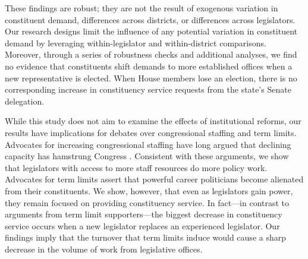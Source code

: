 \documentclass[12pt]{article}
\begin{document}


These findings are robust; they are not the result of exogenous variation in constituent demand, differences across districts, or differences across legislators. Our research designs limit the influence of any potential variation in constituent demand by leveraging within-legislator and within-district comparisons. Moreover, through a series of robustness checks and additional analyses, we find no evidence that constituents shift demands to more established offices when a new representative is elected. When House members lose an election, there is no corresponding increase in constituency service requests from the state's Senate delegation. 


While this study does not aim to examine the effects of institutional reforms, our results have implications for debates over congressional staffing and term limits. Advocates for increasing congressional staffing have long argued that declining capacity has hamstrung Congress \citep{Reynolds2020}. Consistent with these arguments, we show that legislators with access to more staff resources do more policy work. Advocates for term limits assert that powerful career politicians become alienated from their constituents. We show, however, that even as legislators gain power, they remain focused on providing constituency service. In fact---in contrast to arguments from term limit supporters---the biggest decrease in constituency service occurs when a new legislator replaces an experienced legislator.
Our findings imply that the turnover that term limits induce would cause a sharp decrease in the volume of work from legislative offices. 
\end{document}
